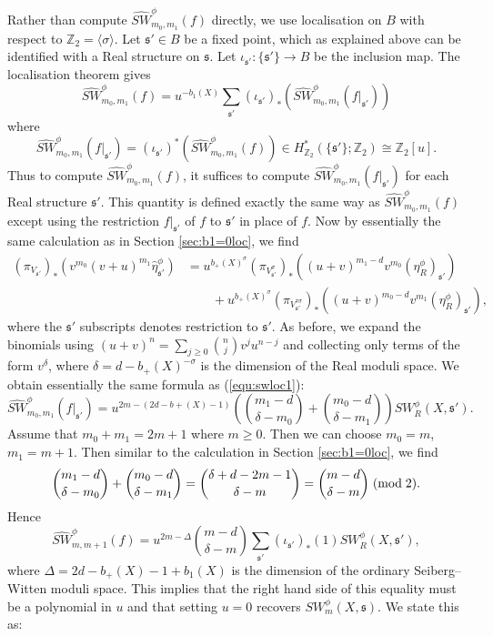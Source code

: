 \documentclass{amsart}
\theoremstyle{definition}
\theoremstyle{remark}
\numberwithin{equation}{section}
\begin{document}
Rather than compute $\widehat{SW}^\phi_{m_0,m_1}(f)$ directly, we use localisation on $B$ with respect to $\mathbb{Z}_2 = \langle \sigma \rangle$. Let $\mathfrak{s}' \in B$ be a fixed point, which as explained above can be identified with a Real structure on $\mathfrak{s}$. Let $\iota_{\mathfrak{s}'} : \{ \mathfrak{s}' \} \to B$ be the inclusion map. The localisation theorem gives
\[
\widehat{SW}^\phi_{m_0,m_1}(f) = u^{-b_1(X)} \sum_{\mathfrak{s}'} (\iota_{\mathfrak{s}'})_* ( \widehat{SW}^\phi_{m_0,m_1}( f|_{\mathfrak{s'}} ) )
\]
where 
\[
\widehat{SW}^\phi_{m_0,m_1}(f|_{\mathfrak{s}'}) = (\iota_{\mathfrak{s}'})^*( \widehat{SW}^\phi_{m_0,m_1}(f) ) \in H^*_{\mathbb{Z}_2}( \{ \mathfrak{s}' \} ; \mathbb{Z}_2 ) \cong \mathbb{Z}_2[u].
\]
Thus to compute $\widehat{SW}^\phi_{m_0,m_1}(f)$, it suffices to compute $\widehat{SW}^\phi_{m_0,m_1}( f|_{\mathfrak{s}'})$ for each Real structure $\mathfrak{s}'$. This quantity is defined exactly the same way as $\widehat{SW}^\phi_{m_0,m_1}(f)$ except using the restriction $f|_{\mathfrak{s}'}$ of $f$ to $\mathfrak{s}'$ in place of $f$. Now by essentially the same calculation as in Section \ref{sec:b1=0loc}, we find
\begin{align*}
(\pi_{V_{\mathfrak{s}'}})_*( v^{m_0}(v+u)^{m_1} \widehat{\eta}^\phi_{\mathfrak{s}'} ) &= u^{b_+(X)^\sigma} (\pi_{V^\sigma_{\mathfrak{s}'}})_*( (u+v)^{m_1 - d} v^{m_0} (\eta^\phi_R)_{\mathfrak{s}'}) \\
& \quad \quad + u^{b_+(X)^\sigma} (\pi_{V_{\mathfrak{s}'}^{\tau \sigma}})_*( (u+v)^{m_0-d} v^{m_1} (\eta^\phi_R)_{\mathfrak{s}'}),
\end{align*}
where the $\mathfrak{s}'$ subscripts denotes restriction to $\mathfrak{s}'$. As before, we expand the binomials using $(u+v)^n = \sum_{j \ge 0} \binom{n}{j} v^j u^{n-j}$ and collecting only terms of the form $v^\delta$, where $\delta = d - b_+(X)^{-\sigma}$ is the dimension of the Real moduli space. We obtain essentially the same formula as (\ref{equ:swloc1}):
\[
\widehat{SW}^\phi_{m_0,m_1}(f|_{\mathfrak{s}'}) = u^{2m-(2d-b+(X)-1)}\left( \binom{m_1-d}{\delta-m_0} + \binom{m_0-d}{\delta-m_1} \right) SW^\phi_R(X,\mathfrak{s}').
\]
Assume that $m_0 + m_1 = 2m+1$ where $m \ge 0$. Then we can choose $m_0 = m$, $m_1 = m+1$. Then similar to the calculation in Section \ref{sec:b1=0loc}, we find
\[
\binom{m_1-d}{\delta - m_0} + \binom{m_0-d}{\delta-m_1} = \binom{\delta+d-2m-1}{\delta-m} = \binom{m-d}{\delta-m} \; ({\rm mod} \; 2).
\]
Hence
\[
\widehat{SW}^\phi_{m,m+1}(f) = u^{2m-\Delta} \binom{m-d}{\delta-m} \sum_{\mathfrak{s}'} (\iota_{\mathfrak{s}'})_*(1) SW^\phi_R(X, \mathfrak{s}'),
\]
where $\Delta = 2d - b_+(X) - 1 + b_1(X)$ is the dimension of the ordinary Seiberg--Witten moduli space. This implies that the right hand side of this equality must be a polynomial in $u$ and that setting $u=0$ recovers $SW^\phi_m(X,\mathfrak{s})$. We state this as:
\end{document}
